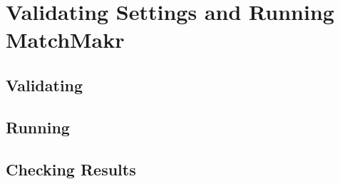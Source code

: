 \chapter{Validating Settings and Running MatchMakr}

\section{Validating}

\section{Running}

\section{Checking Results}